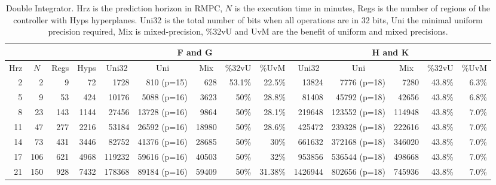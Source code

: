 \begin{table*}[t]
  \centering
  \caption{Double Integrator.\textmd{ Hrz is the prediction horizon in RMPC, $N$ is the execution time in minutes, Regs is the number of regions of the controller with Hyps hyperplanes. Uni32 is the total number of bits when all operations are in 32 bits, Uni the minimal uniform precision required, Mix is mixed-precision, \%32vU and UvM are the benefit of uniform and mixed precisions.}}
  \label{tab:di}
  \begin{tabular}{|rrrrrrrrrrrrrr|}
    \cline{5-14}
    \multicolumn{4}{c}{} &
    \multicolumn{5}{|c|}{F and G} &
    \multicolumn{5}{c|}{H and K} \\
    \hline
    \multicolumn{1}{|c}{Hrz}&
    \multicolumn{1}{c}{$N$}&
    \multicolumn{1}{c}{Regs} &
    \multicolumn{1}{c}{Hyps} &
    \multicolumn{1}{c}{Uni32}&
    \multicolumn{1}{c}{Uni}&
    \multicolumn{1}{c}{Mix}&
    \multicolumn{1}{c}{\%32vU}&
    \multicolumn{1}{c}{\%UvM}&
    \multicolumn{1}{c}{Uni32}&
    \multicolumn{1}{c}{Uni}&
    \multicolumn{1}{c}{Mix}&
    \multicolumn{1}{c}{\%32vU}&
    \multicolumn{1}{c|}{\%UvM} \\
    \hline
    2 & 2 & 9 & 72 & 1728 & 810 (p=15) & 628 & 53.1\% & 22.5\% & 13824 & 7776 (p=18) & 7280 & 43.8\%& 6.3\% \\
    5 & 9 & 53 & 424 & 10176 & 5088 (p=16) & 3623 & 50\% & 28.8\% & 81408 & 45792 (p=18) & 42656 & 43.8\% & 6.8\% \\
    8 & 23 & 143 & 1144 & 27456 & 13728 (p=16) & 9864 & 50\%  & 28.1\% & 219648 & 123552 (p=18) & 114948 & 43.8\% & 7.0\% \\
    11 & 47 & 277 & 2216 & 53184 & 26592 (p=16) & 18980 & 50\% & 28.6\% & 425472 & 239328 (p=18) & 222616 & 43.8\% & 7.0\% \\
    
    14 & 73 & 431& 3446& 82752& 41376 (p=16)& 28685& 50\% & 30\% & 661632& 372168 (p=18)& 346020& 43.8\% &7.0\% \\
    
    17 & 106 & 621 & 4968 & 119232 & 59616 (p=16) & 40503 & 50\% & 32\% & 953856& 536544 (p=18)& 498668& 43.8\% & 7.0\% \\
    
    21 & 150 & 928 & 7432 & 178368 & 89184 (p=16) & 59409 & 50\% & 31.38\% & 1426944 & 802656 (p=18) & 745936 & 43.8\% & 7.0\%  \\
    

\end{tabular}
\end{table*}
